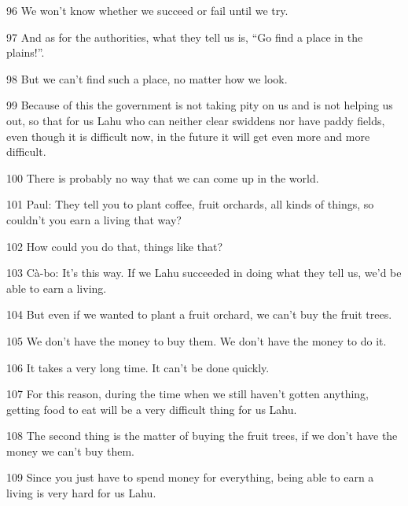 96 We won't know whether we succeed or fail until we try.

97 And as for the authorities, what they tell us is, ``Go find a place in the plains!''.

98 But we can't find such a place, no matter how we look.

99 Because of this the government is not taking pity on us and is not helping us
out, so that for us Lahu who can neither clear swiddens nor have paddy fields,
even though it is difficult now, in the future it will get even more and more difficult.

100 There is probably no way that we can come up in the world.

101 Paul: They tell you to plant coffee, fruit orchards, all kinds of things, so
couldn't you earn a living that way?

102 How could you do that, things like that?

103 Cà-bo: It's this way. If we Lahu succeeded in doing what they tell us, we'd
be able to earn a living.

104 But even if we wanted to plant a fruit orchard, we can't buy the fruit trees.

105 We don't have the money to buy them. We don't have the money to do it.

106 It takes a very long time. It can't be done quickly.

107 For this reason, during the time when we still haven't gotten anything, getting
food to eat will be a very difficult thing for us Lahu.

108 The second thing is the matter of buying the fruit trees, if we don't have
the money we can't buy them.

109 Since you just have to spend money for everything, being able to earn a living
is very hard for us Lahu.


